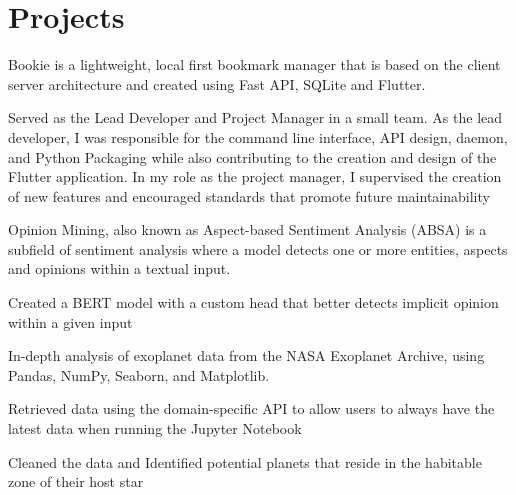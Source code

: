 \documentclass[]{resume-template}
\begin{document}
\begin{minipage}[t]{0.66\textwidth}


    \section{Projects}\label{sec:projects}

    \label{subsec: Bookie}
    \vspace{\topsep}
    \begin{tightemize}
        \item Bookie is a lightweight, local first bookmark manager that is based on the client server architecture and created using Fast API, SQLite and Flutter.
        \item Served as the Lead Developer and Project Manager in a small team. As the lead developer, I was responsible for the command line interface, API design, daemon, and Python Packaging
        while also contributing to the creation and design of the Flutter application. In my role as the project manager, I supervised the creation of new features and encouraged standards that promote future
        maintainability

    \end{tightemize}
    \label{subsec:opinionmining}
    \begin{tightemize}
        \item Opinion Mining, also known as Aspect-based Sentiment Analysis (ABSA) is a subfield of sentiment analysis
        where a model detects one or more entities, aspects and opinions within a textual input.
        \item Created a BERT model with a custom head that better detects implicit opinion within a given input

    \end{tightemize}

    \label{subsec:exo-eda}
    \begin{tightemize}
        \item In-depth analysis of exoplanet data from the NASA Exoplanet Archive, using Pandas, NumPy,
        Seaborn, and Matplotlib.
        \item Retrieved data using the domain-specific API to allow users to always have the latest data when running the Jupyter Notebook
        \item Cleaned the data and Identified potential planets that reside in the habitable zone of their host star
    \end{tightemize}


\end{minipage}
\end{document}
